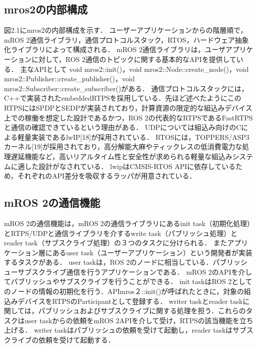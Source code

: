 \subsection{mros2の内部構成}
図2.1にmros2の内部構成を示す．
ユーザーアプリケーションからの階層順で，mROS 2通信ライブラリ，通信プロトコルスタック，RTOS，ハードウェア抽象化ライブラリによって構成される．
mROS 2通信ライブラリは，ユーザアプリケーションに対して，ROS 2通信のトピックに関する基本的なAPIを提供している．
主なAPIとして void mros2::init()，void mros2::Node::create\_node()，void mros2::Publisher::create\_publisher()，void mros2::Subscriber::create\_subscriber()がある．
通信プロトコルスタックには，C++で実装されたembeddedRTPSを採用している．先ほど述べたようにこのRTPSにはSPDPとSEDPが実装されており，計算資源の限定的な組込みデバイス上での稼働を想定した設計であるかつ，ROS 2の代表的なRTPSであるFastRTPSと通信の確認できているという理由がある．
UDPについては組込み向けのCによる軽量実装であるlwIP[18]が採用されている．
RTOSには，TOPPERS/ASP3カーネル[19]が採用されており，高分解能大麻やティックレスの低消費電力な処理遅延機能など，高いリアルタイム性と安全性が求められる軽量な組込みシステムに適した設計がなされている．
lwipはCMSIS-RTOS APIに依存しているため，それぞれのAPI差分を吸収するラッパが用意されている．
\subsection{mROS 2の通信機能}
mROS 2の通信機能は，mROS 2の通信ライブラリにあるinit task（初期化処理）とRTPS/UDPと通信ライブラリを介するwrite task（パブリッシュ処理）とreader task（サブスクライブ処理）の３つのタスクに分けられる．
またアプリケーション層にあるuser task（ユーザーアプリケーション）という開発者が実装するタスクがある．
user taskは，ROS 2のノードに相当している．パブリッシューサブスクライブ通信を行うアプリケーションである．
mROS 2のAPIを介してパブリッシュやサブスクライブを行うことができる．
init taskはROS 2としてのノードの情報の初期化を行う．APImros２::init()が呼ばれたときに，対象の組込みデバイスをRTPSのParticipantとして登録する．
writer taskとreader taskに関しては，パブリッシュおよびサブスクライブに関する処理を担う．これらのタスクはuser taskからの依頼をmROS 2APIを介して受け，RTPSの該当機能を立ち上げる．
writer taskはパブリッシュの依頼を受けて起動し，reader taskはサブスクライブの依頼を受けて起動する．
